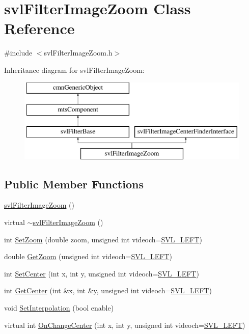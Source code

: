\hypertarget{classsvl_filter_image_zoom}{}\section{svl\+Filter\+Image\+Zoom Class Reference}
\label{classsvl_filter_image_zoom}


{\ttfamily \#include $<$svl\+Filter\+Image\+Zoom.\+h$>$}

Inheritance diagram for svl\+Filter\+Image\+Zoom\+:\begin{figure}[H]
\begin{center}
\leavevmode
\includegraphics[height=4.000000cm]{d6/dd0/classsvl_filter_image_zoom}
\end{center}
\end{figure}
\subsection*{Public Member Functions}
\begin{DoxyCompactItemize}
\item 
\hyperlink{classsvl_filter_image_zoom_aebd5c28f8f39d9feb64d955f6e77e270}{svl\+Filter\+Image\+Zoom} ()
\item 
virtual \hyperlink{classsvl_filter_image_zoom_a343d14b4c0e94f675705e81dea0d3ea0}{$\sim$svl\+Filter\+Image\+Zoom} ()
\item 
int \hyperlink{classsvl_filter_image_zoom_a4baf0459573f20a2db8ed3c41640376c}{Set\+Zoom} (double zoom, unsigned int videoch=\hyperlink{svl_definitions_8h_ab9fec7615f19c8df2919eebcab0b187f}{S\+V\+L\+\_\+\+L\+E\+F\+T})
\item 
double \hyperlink{classsvl_filter_image_zoom_a12b43f99c2f2a88613a78ab9d1c84029}{Get\+Zoom} (unsigned int videoch=\hyperlink{svl_definitions_8h_ab9fec7615f19c8df2919eebcab0b187f}{S\+V\+L\+\_\+\+L\+E\+F\+T})
\item 
int \hyperlink{classsvl_filter_image_zoom_a6c5bd854be6bd0f931ba7e3cf0279f55}{Set\+Center} (int x, int y, unsigned int videoch=\hyperlink{svl_definitions_8h_ab9fec7615f19c8df2919eebcab0b187f}{S\+V\+L\+\_\+\+L\+E\+F\+T})
\item 
int \hyperlink{classsvl_filter_image_zoom_aaa62c00e9c31a1f93c874dfa2251ec70}{Get\+Center} (int \&x, int \&y, unsigned int videoch=\hyperlink{svl_definitions_8h_ab9fec7615f19c8df2919eebcab0b187f}{S\+V\+L\+\_\+\+L\+E\+F\+T})
\item 
void \hyperlink{classsvl_filter_image_zoom_a98262bca1c64a6b2feca5f6f2ebe4185}{Set\+Interpolation} (bool enable)
\item 
virtual int \hyperlink{classsvl_filter_image_zoom_a293a0e896ac3eb1a9929fe0c3b128cdb}{On\+Change\+Center} (int x, int y, unsigned int videoch=\hyperlink{svl_definitions_8h_ab9fec7615f19c8df2919eebcab0b187f}{S\+V\+L\+\_\+\+L\+E\+F\+T})
\end{DoxyCompactItemize}
